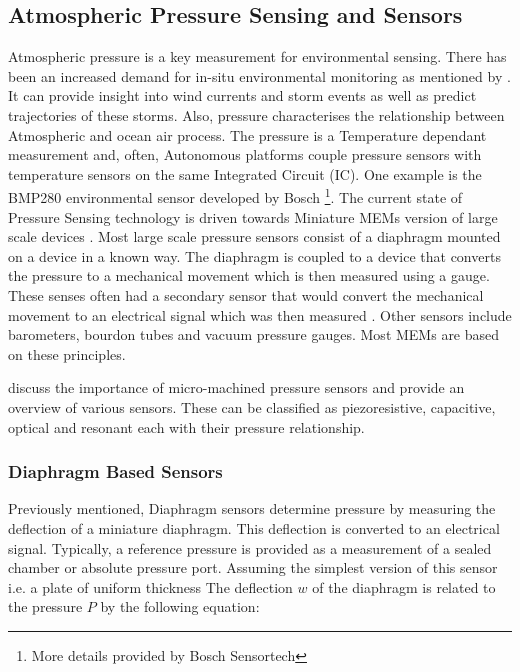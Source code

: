 \subsection{Atmospheric Pressure Sensing and Sensors}
Atmospheric pressure is a key measurement for environmental sensing. There has been an increased demand for in-situ environmental monitoring as mentioned by \cite{vichi2019effects} \cite{kennicutt2014polar} \cite{kennicutt2016delivering} \cite{kennicutt2019sustained} \cite{alberello2019drift}. It can provide insight into wind currents and storm events as well as predict trajectories of these storms. Also, pressure characterises the relationship between Atmospheric and ocean air process. The pressure is a Temperature dependant measurement \cite{mansoor2015silicon} and, often, Autonomous platforms couple pressure sensors with temperature sensors on the same Integrated Circuit (IC). One example is the BMP280 environmental sensor developed by Bosch \footnote{More details provided by Bosch Sensortech }. The current state of Pressure Sensing technology is driven towards Miniature MEMs version of large scale devices \cite{eaton1997micromachined}. Most large scale pressure sensors consist of a diaphragm mounted on a device in a known way. The diaphragm is coupled to a device that converts the pressure to a mechanical movement which is then measured using a gauge. These senses often had a secondary sensor that would convert the mechanical movement to an electrical signal which was then measured \cite{eaton1997micromachined}. Other sensors include barometers, bourdon tubes and vacuum pressure gauges. Most MEMs are based on these principles.\par 
\textcite{eaton1997micromachined} discuss the importance of micro-machined pressure sensors and provide an overview of various sensors. These can be classified as piezoresistive, capacitive, optical and resonant each with their pressure relationship.
\subsubsection{Diaphragm Based Sensors}
Previously mentioned, Diaphragm sensors determine pressure by measuring the deflection of a miniature diaphragm. This deflection is converted to an electrical signal. Typically, a reference pressure is provided as a measurement of a sealed chamber or absolute pressure port. Assuming the simplest version of this sensor i.e. a plate of uniform thickness \cite{eaton1997micromachined} The deflection $w$ of the diaphragm is related to the pressure  $P$ by the following equation: \cite{eaton1997micromachined}


